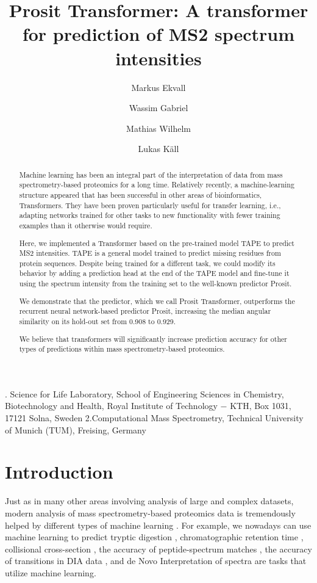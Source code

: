 \documentclass[10pt,a4paper]{article}
\title{Prosit Transformer: A transformer for prediction of MS2 spectrum intensities}
\author{Markus Ekvall \and Wassim Gabriel \and Mathias Wilhelm \and Lukas Käll}
\begin{document}
{}. Science for Life Laboratory, School of Engineering Sciences in Chemistry, Biotechnology and Health, Royal Institute of Technology − KTH, Box 1031, 17121 Solna, Sweden
2.Computational Mass Spectrometry, Technical University of Munich (TUM), Freising, Germany

\begin{abstract}
Machine learning has been an integral part of the interpretation of data from mass spectrometry-based proteomics for a long time. Relatively recently, a machine-learning structure appeared that has been successful in other areas of bioinformatics, Transformers. They have been proven particularly useful for transfer learning, i.e., adapting networks trained for other tasks to new functionality with fewer training examples than it otherwise would require. 

Here, we implemented a Transformer based on the pre-trained model TAPE to predict MS2 intensities. TAPE is a general model trained to predict missing residues from protein sequences. Despite being trained for a different task, we could modify its behavior by adding a prediction head at the end of the TAPE model and fine-tune it using the spectrum intensity from the training set to the well-known predictor Prosit.

We demonstrate that the predictor, which we call Prosit Transformer, outperforms the recurrent neural network-based predictor Prosit, increasing the median angular similarity on its hold-out set from 0.908 to 0.929.

We believe that transformers will significantly increase prediction accuracy for other types of predictions within mass spectrometry-based proteomics.
\end{abstract}
  

\section*{Introduction}
Just as in many other areas involving analysis of large and complex datasets, modern analysis of mass spectrometry-based proteomics data is tremendously helped by different types of machine learning \cite{Meyer2021-hc,Mann2021-kx}. For example, we nowadays can use machine learning to predict tryptic digestion \cite{Yang2021-ng}, chromatographic retention time \cite{Moruz2010-ls,Ma2018-wy,Martens_undated-vs}, collisional cross-section \cite{Meier2021-ur}, the accuracy of peptide-spectrum matches \cite{Kall2007-ll}, the accuracy of transitions in DIA data \cite{Demichev2020-zd}, and de Novo Interpretation of spectra \cite{Tran2017-lk} are tasks that utilize machine learning.
\end{document}
